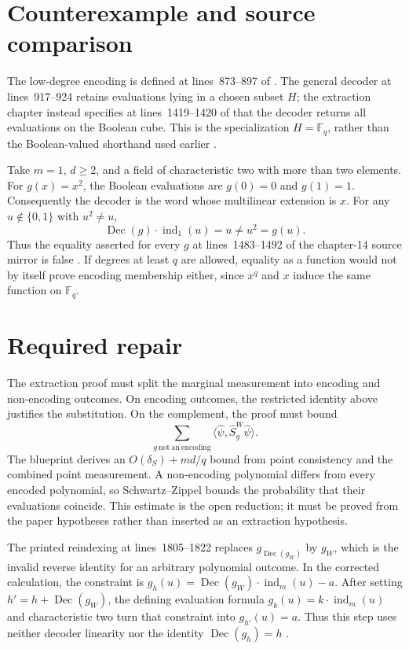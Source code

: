 \documentclass[11pt]{article}
\begin{document}
\section{Counterexample and source comparison}

The low-degree encoding is defined at lines~873--897 of
.  The general decoder at
lines~917--924 retains evaluations lying in a chosen subset $H$; the extraction
chapter instead specifies at lines~1419--1420 of
 that the
decoder returns all evaluations on the Boolean cube.  This is the specialization
$H=\mathbb F_q$, rather than the Boolean-valued shorthand used earlier
\cite[lines~873--924 and 1419--1420]{Ji2020MIPStar}.

Take $m=1$, $d\geq2$, and a field of characteristic two with more than two
elements.  For $g(x)=x^2$, the Boolean evaluations are $g(0)=0$ and $g(1)=1$.
Consequently the decoder is the word whose multilinear extension is $x$.
For any $u\notin\{0,1\}$ with $u^2\neq u$,
\[
  \operatorname{Dec}(g)\mathbin{\cdot}\operatorname{ind}_1(u)=u
  \neq u^2=g(u).
\]
Thus the equality asserted for every $g$ at lines~1483--1492 of the chapter-14
source mirror is false \cite[lines~1483--1492]{Ji2020MIPStar}.  If degrees at
least $q$ are allowed, equality as a function would not by itself prove encoding
membership either, since $x^q$ and $x$ induce the same function on $\mathbb F_q$.

\section{Required repair}

The extraction proof must split the marginal measurement into encoding and
non-encoding outcomes.  On encoding outcomes, the restricted identity above
justifies the substitution.  On the complement, the proof must bound
\[
  \sum_{g\ \mathrm{not\ an\ encoding}}
  \langle\widehat\psi,\widehat S_g^W\widehat\psi\rangle.
\]
The blueprint derives an $O(\delta_S)+md/q$ bound from point consistency and
the combined point measurement.  A non-encoding polynomial differs from every
encoded polynomial, so Schwartz--Zippel bounds the probability that their
evaluations coincide.  This estimate is the open reduction; it must be proved
from the paper hypotheses rather than inserted as an extraction hypothesis.

The printed reindexing at lines~1805--1822 replaces
$g_{\operatorname{Dec}(g_W)}$ by $g_W$, which is the invalid reverse identity
for an arbitrary polynomial outcome.  In the corrected calculation, the
constraint is
$g_h(u)=\operatorname{Dec}(g_W)\mathbin{\cdot}\operatorname{ind}_m(u)-a$.
After setting $h'=h+\operatorname{Dec}(g_W)$, the defining evaluation formula
$g_k(u)=k\mathbin{\cdot}\operatorname{ind}_m(u)$ and characteristic two turn
that constraint into $g_{h'}(u)=a$.  Thus this step uses neither decoder
linearity nor the identity $\operatorname{Dec}(g_h)=h$
\cite[lines~1805--1822]{Ji2020MIPStar}.
\end{document}
